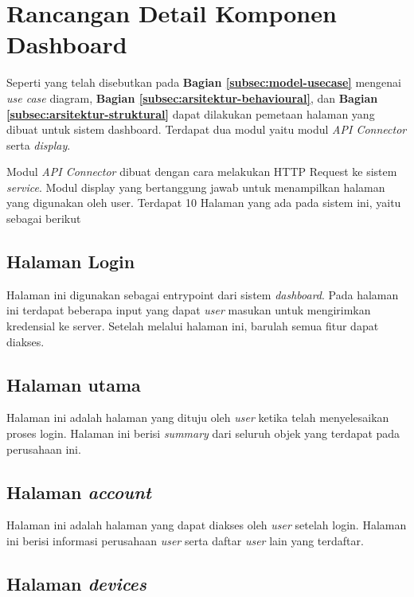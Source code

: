 \section{Rancangan Detail Komponen Dashboard}
\label{sec:rancangan-dashboard}

Seperti yang telah disebutkan pada \textbf{Bagian \ref{subsec:model-usecase}} mengenai \textit{use case} diagram, \textbf{Bagian \ref{subsec:arsitektur-behavioural}}, dan \textbf{Bagian \ref{subsec:arsitektur-struktural}} dapat dilakukan pemetaan halaman yang dibuat untuk sistem dashboard. Terdapat dua modul yaitu modul \textit{API Connector} serta \textit{display}.

Modul \textit{API Connector} dibuat dengan cara melakukan HTTP Request ke sistem \textit{service}. Modul display yang bertanggung jawab untuk menampilkan halaman yang digunakan oleh user. Terdapat 10 Halaman yang ada pada sistem ini, yaitu sebagai berikut

\subsection{Halaman Login}

Halaman ini digunakan sebagai entrypoint dari sistem \textit{dashboard}. Pada halaman ini terdapat beberapa input yang dapat \textit{user} masukan untuk mengirimkan kredensial ke server. Setelah melalui halaman ini, barulah semua fitur dapat diakses.

\subsection{Halaman utama}

Halaman ini adalah halaman yang dituju oleh \textit{user} ketika telah menyelesaikan proses login. Halaman ini berisi \textit{summary} dari seluruh objek yang terdapat pada perusahaan ini.

\subsection{Halaman \textit{account}}

Halaman ini adalah halaman yang dapat diakses oleh \textit{user} setelah login. Halaman ini berisi informasi perusahaan \textit{user} serta daftar \textit{user} lain yang terdaftar.

\subsection{Halaman \textit{devices}}

